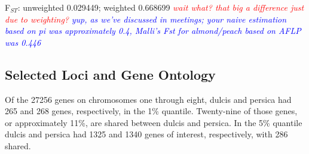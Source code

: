 \documentclass[12pt]{article}
\newcommand{\jri}[1]{\textcolor{red}{\emph{#1}}}
\newcommand{\dv}[1]{\textcolor{blue}{\emph{#1}}}
\begin{document}
F$_{ST}$: unweighted 0.029449; weighted 0.668699 \jri{wait what? that big a difference just due to weighting?} \dv{yup, as we've discussed in meetings; your naive estimation based on pi was approximately 0.4, Malli's Fst for almond/peach based on AFLP was 0.446 \citep{aradhya2004molecular}}
%
\subsection*{Selected Loci and Gene Ontology}
Of the 27256 genes on chromosomes one through eight, dulcis and persica had 265 and 268 genes, respectively, in the 1\% quantile. 
%
Twenty-nine of those genes, or approximately 11\%, are shared between dulcis and persica.
%
In the 5\% quantile dulcis and persica had 1325 and 1340 genes of interest, respectively, with 286 shared.
%
%
\end{document}

